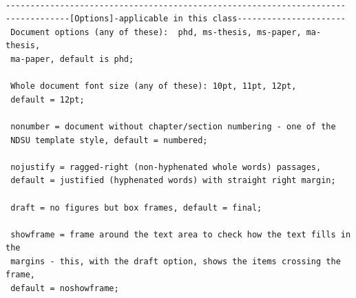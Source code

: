 \documentclass[phd,showframe]{ndsu-thesis-2022}
\begin{document}
\begin{lstlisting}[basicstyle=\ttfamily\footnotesize\color{blue}] %or \small or \footnotesize etc.

---------------------------------------------------------------------
-------------[Options]-applicable in this class----------------------
 Document options (any of these):  phd, ms-thesis, ms-paper, ma-thesis, 
 ma-paper, default is phd; 
 
 Whole document font size (any of these): 10pt, 11pt, 12pt, 
 default = 12pt; 
 
 nonumber = document without chapter/section numbering - one of the 
 NDSU template style, default = numbered; 
 
 nojustify = ragged-right (non-hyphenated whole words) passages, 
 default = justified (hyphenated words) with straight right margin; 
 
 draft = no figures but box frames, default = final; 
 
 showframe = frame around the text area to check how the text fills in the 
 margins - this, with the draft option, shows the items crossing the frame, 
 default = noshowframe; 
 

\end{lstlisting}
\end{document}
